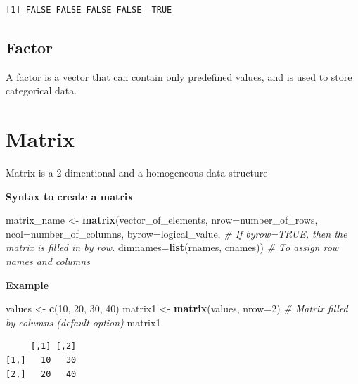 \documentclass[]{book}
\newenvironment{Shaded}{\begin{snugshade}}{\end{snugshade}}
\newcommand{\CommentTok}[1]{\textcolor[rgb]{0.56,0.35,0.01}{\textit{#1}}}
\newcommand{\DataTypeTok}[1]{\textcolor[rgb]{0.13,0.29,0.53}{#1}}
\newcommand{\DecValTok}[1]{\textcolor[rgb]{0.00,0.00,0.81}{#1}}
\newcommand{\KeywordTok}[1]{\textcolor[rgb]{0.13,0.29,0.53}{\textbf{#1}}}
\newcommand{\NormalTok}[1]{#1}
\newcommand{\StringTok}[1]{\textcolor[rgb]{0.31,0.60,0.02}{#1}}
\begin{document}
\begin{verbatim}
[1] FALSE FALSE FALSE FALSE  TRUE
\end{verbatim}

\hypertarget{factor}{%
\subsection{Factor}\label{factor}}

A factor is a vector that can contain only predefined values, and is used to store categorical data.

\hypertarget{matrix}{%
\section{Matrix}\label{matrix}}

Matrix is a 2-dimentional and a homogeneous data structure

\textbf{Syntax to create a matrix}

\begin{Shaded}
\begin{Highlighting}[]
\NormalTok{matrix_name <-}\StringTok{ }\KeywordTok{matrix}\NormalTok{(vector_of_elements, }
                      \DataTypeTok{nrow=}\NormalTok{number_of_rows,}
                      \DataTypeTok{ncol=}\NormalTok{number_of_columns,}
                      \DataTypeTok{byrow=}\NormalTok{logical_value, }\CommentTok{# If byrow=TRUE, then the matrix is filled in by row.}
                      \DataTypeTok{dimnames=}\KeywordTok{list}\NormalTok{(rnames, cnames)) }\CommentTok{# To assign row names and columns}
\end{Highlighting}
\end{Shaded}

\textbf{Example}

\begin{Shaded}
\begin{Highlighting}[]
\NormalTok{values <-}\StringTok{ }\KeywordTok{c}\NormalTok{(}\DecValTok{10}\NormalTok{, }\DecValTok{20}\NormalTok{, }\DecValTok{30}\NormalTok{, }\DecValTok{40}\NormalTok{)}
\NormalTok{matrix1 <-}\StringTok{ }\KeywordTok{matrix}\NormalTok{(values, }\DataTypeTok{nrow=}\DecValTok{2}\NormalTok{) }\CommentTok{# Matrix filled by columns (default option)}
\NormalTok{matrix1}
\end{Highlighting}
\end{Shaded}

\begin{verbatim}
     [,1] [,2]
[1,]   10   30
[2,]   20   40
\end{verbatim}
\end{document}
